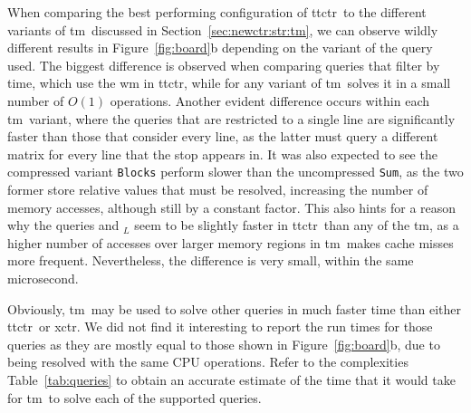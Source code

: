     When comparing the best performing configuration of \gls{ttctr}~to the different variants of \gls{tm}~discussed in Section~\ref{sec:newctr:str:tm}, we can observe wildly different results in Figure~\ref{fig:board}b depending on the variant of the \boardX query used. The biggest difference is observed when comparing queries that filter by time, which use the \gls{wm} in \gls{ttctr}, while for any variant of \gls{tm}~solves it in a small number of $O(1)$ operations. Another evident difference occurs within each \gls{tm}~variant, where the queries that are restricted to a single line are significantly faster than those that consider every line, as the latter must query a different matrix for every line that the stop appears in. It was also expected to see the compressed variant \texttt{Blocks} perform slower than the uncompressed \texttt{Sum}, as the two former store relative values that must be resolved, increasing the number of memory accesses, although still by a constant factor. This also hints for a reason why the queries \boardX and \boardX$_{L}$ seem to be slightly faster in \gls{ttctr}~than any of the \gls{tm}, as a higher number of accesses over larger memory regions in \gls{tm}~makes cache misses more frequent. Nevertheless, the difference is very small, within the same microsecond.
    
    Obviously, \gls{tm}~may be used to solve other queries in much faster time than either \gls{ttctr}~or \gls{xctr}. We did not find it interesting to report the run times for those queries as they are mostly equal to those shown in Figure~\ref{fig:board}b, due to being resolved with the same CPU operations. Refer to the complexities Table~\ref{tab:queries} to obtain an accurate estimate of the time that it would take for \gls{tm}~to solve each of the supported queries.
